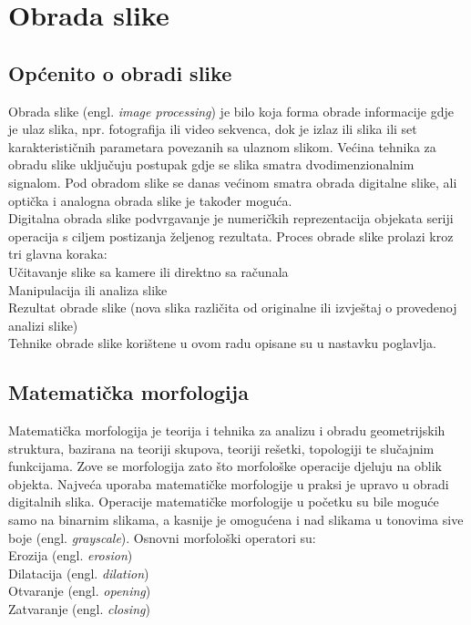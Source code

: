 \documentclass[times, zavrsni, numeric, utf8]{fer}
\begin{document}
\chapter{Obrada slike}
\label{chap:ip}
\section{Općenito o obradi slike}
\hspace*{0.5cm}Obrada slike (engl. \textit{image processing}) je bilo koja forma obrade informacije gdje je ulaz slika, npr. fotografija ili video sekvenca, dok je izlaz ili slika ili set karakterističnih parametara povezanih sa ulaznom slikom. Većina tehnika za obradu slike uključuju postupak gdje se slika smatra dvodimenzionalnim signalom. Pod obradom slike se danas većinom smatra obrada digitalne slike, ali optička i analogna obrada slike je također moguća. \\
\hspace*{0.5cm}Digitalna obrada slike podvrgavanje je numeričkih reprezentacija objekata seriji operacija s ciljem postizanja željenog rezultata. 
Proces obrade slike prolazi kroz tri glavna koraka: \\
\hspace*{0.5cm}\textbullet{} Učitavanje slike sa kamere ili direktno sa računala \\
\hspace*{0.5cm}\textbullet{} Manipulacija ili analiza slike \\
\hspace*{0.5cm}\textbullet{} Rezultat obrade slike (nova slika različita od originalne ili izvještaj o provedenoj analizi slike) \\
Tehnike obrade slike korištene u ovom radu opisane su u nastavku poglavlja.
\section{Matematička morfologija}
\label{schap:mm}
\hspace*{0.5cm}Matematička morfologija\cite{wikimm} je teorija i tehnika za analizu i obradu geometrijskih struktura, bazirana na teoriji skupova, teoriji rešetki, topologiji te slučajnim funkcijama. Zove se morfologija zato što morfološke operacije djeluju na oblik objekta. Najveća uporaba matematičke morfologije u praksi je upravo u obradi digitalnih slika. Operacije matematičke morfologije u početku su bile moguće samo na binarnim slikama, a kasnije je omogućena i nad slikama u tonovima sive boje (engl. \textit{grayscale}). Osnovni morfološki operatori su: \\
\hspace*{0.5cm}\textbullet{} Erozija (engl. \textit{erosion}) \\
\hspace*{0.5cm}\textbullet{} Dilatacija (engl. \textit{dilation}) \\
\hspace*{0.5cm}\textbullet{} Otvaranje (engl. \textit{opening}) \\
\hspace*{0.5cm}\textbullet{} Zatvaranje (engl. \textit{closing}) 
\end{document}
